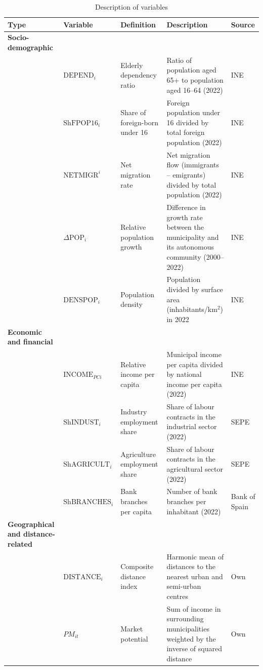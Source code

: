\documentclass[a4paper,11pt,oneside]{article}
\begin{document}
\begin{table}
\centering
\begin{threeparttable}
\scriptsize
\caption{Description of variables}
\label{tbl:1}
\begin{tabular}{ll>{\raggedright}p{4.3cm}>{\raggedright\arraybackslash}p{5.2cm}>{\centering\arraybackslash}p{2cm}}
\toprule
Type & Variable & Definition & Description & Source \\
\midrule

\textbf{Socio-demographic} \\
& \(\text{DEPEND}_{i}\) & Elderly dependency ratio & Ratio of population aged 65+ to population aged 16–64 (2022) & INE \\
& \(\text{ShFPOP16}_{i}\) & Share of foreign-born under 16 & Foreign population under 16 divided by total foreign population (2022) & INE \\
& \(\text{NETMIGR}^{i}\) & Net migration rate & Net migration flow (immigrants – emigrants) divided by total population (2022) & INE \\
& \(\Delta\text{POP}_{i}\) & Relative population growth & Difference in growth rate between the municipality and its autonomous community (2000–2022) & INE \\
& \(\text{DENSPOP}_{i}\) & Population density & Population divided by surface area (inhabitants/km\(^2\)) in 2022 & INE \\

\midrule
\textbf{Economic and financial} \\
& \(\text{INCOME}_{PCi}\) & Relative income per capita & Municipal income per capita divided by national income per capita (2022) & INE \\
& \(\text{ShINDUST}_{i}\) & Industry employment share & Share of labour contracts in the industrial sector (2022) & SEPE \\
& \(\text{ShAGRICULT}_{i}\) & Agriculture employment share & Share of labour contracts in the agricultural sector (2022) & SEPE \\
& \(\text{ShBRANCHES}_{i}\) & Bank branches per capita & Number of bank branches per inhabitant (2022) & Bank of Spain \\

\midrule
\textbf{Geographical and distance-related} \\
& \(\text{DISTANCE}_{i}\) & Composite distance index & Harmonic mean of distances to the nearest urban and semi-urban centres & Own \\
& \(PM_{it}\) & Market potential & Sum of income in surrounding municipalities weighted by the inverse of squared distance & Own \\


\end{tabular}
\end{threeparttable}
\end{table}
\end{document}
